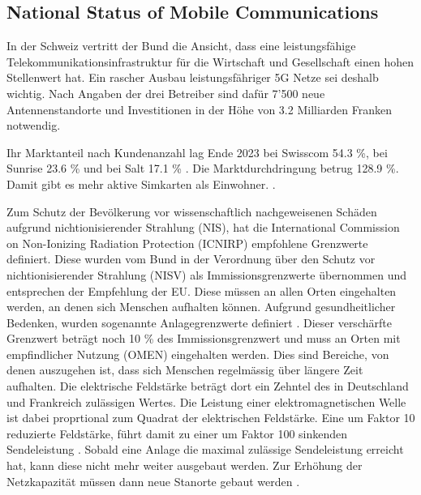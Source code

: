 \subsection{National Status of Mobile Communications}
\begin{German}
    In der Schweiz vertritt der Bund die Ansicht, dass eine leistungsfähige Telekommunikationsinfrastruktur für die Wirtschaft und Gesellschaft einen hohen Stellenwert hat. Ein rascher Ausbau leistungsfähriger 5G Netze sei deshalb wichtig. Nach Angaben der drei Betreiber sind dafür 7'500 neue Antennenstandorte und Investitionen in der Höhe von 3.2 Milliarden Franken notwendig. \cite{bundesratNachhaltigesMobilfunknetzBericht2022}

    Ihr Marktanteil nach Kundenanzahl lag Ende 2023 bei Swisscom 54.3 \%, bei Sunrise 23.6 \% und bei Salt 17.1 \% \cite{bakomMarktanteileMobilfunknetz}. Die Marktdurchdringung betrug 128.9 \%. Damit gibt es mehr aktive Simkarten als Einwohner. \cite{bakomAnzahlMobilfunkkundinnenUnd}.

    Zum Schutz der Bevölkerung vor wissenschaftlich nachgeweisenen Schäden aufgrund nichtionisierender Strahlung (NIS), hat die International Commission on Non-Ionizing Radiation Protection (ICNIRP) empfohlene Grenzwerte definiert. Diese wurden vom Bund in der Verordnung über den Schutz vor nichtionisierender Strahlung (NISV) als Immissionsgrenzwerte übernommen und entsprechen der Empfehlung der EU. Diese müssen an allen Orten eingehalten werden, an denen sich Menschen aufhalten können. Aufgrund gesundheitlicher Bedenken, wurden sogenannte Anlagegrenzwerte definiert \cite{baumannMitVerordnungUeber2005}. Dieser verschärfte Grenzwert beträgt noch 10 \% des Immissionsgrenzwert und muss an Orten mit empfindlicher Nutzung (OMEN) eingehalten werden. Dies sind Bereiche, von denen auszugehen ist, dass sich Menschen regelmässig über längere Zeit aufhalten. Die elektrische Feldstärke beträgt dort ein Zehntel des in Deutschland und Frankreich zulässigen Wertes. Die Leistung einer elektromagnetischen Welle ist dabei proprtional zum Quadrat der elektrischen Feldstärke. Eine um Faktor 10 reduzierte Feldstärke, führt damit zu einer um Faktor 100 sinkenden Sendeleistung \cite{chance5gAnlagegrenzwerteImMobilfunk}.
    Sobald eine Anlage die maximal zulässige Sendeleistung erreicht hat, kann diese nicht mehr weiter ausgebaut werden. Zur Erhöhung der Netzkapazität müssen dann neue Stanorte gebaut werden \cite{bundesratNachhaltigesMobilfunknetzBericht2022}.
\end{German}

